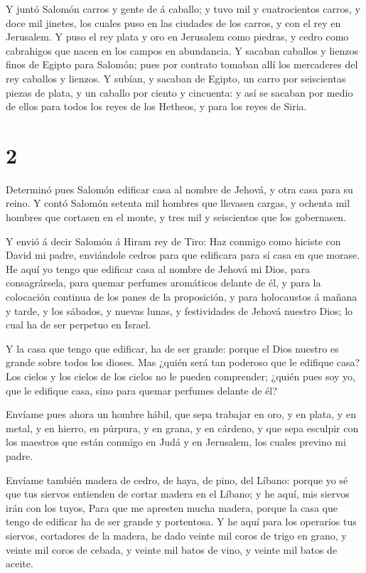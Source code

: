  Y juntó Salomón carros y gente de á caballo; y tuvo mil y
cuatrocientos carros, y doce mil jinetes, los cuales puso en las
ciudades de los carros, y con el rey en Jerusalem.  Y puso
el rey plata y oro en Jerusalem como piedras, y cedro como cabrahigos
que nacen en los campos en abundancia.  Y sacaban caballos
y lienzos finos de Egipto para Salomón; pues por contrato tomaban allí
los mercaderes del rey caballos y lienzos.  Y subían, y
sacaban de Egipto, un carro por seiscientas piezas de plata, y un
caballo por ciento y cincuenta: y así se sacaban por medio de ellos para
todos los reyes de los Hetheos, y para los reyes de Siria.

\hypertarget{section-1}{%
\section{2}\label{section-1}}

 Determinó pues Salomón edificar casa al nombre de Jehová, y
otra casa para su reino.  Y contó Salomón setenta mil
hombres que llevasen cargas, y ochenta mil hombres que cortasen en el
monte, y tres mil y seiscientos que los gobernasen.

 Y envió á decir Salomón á Hiram rey de Tiro: Haz conmigo
como hiciste con David mi padre, enviándole cedros para que edificara
para sí casa en que morase.  He aquí yo tengo que edificar
casa al nombre de Jehová mi Dios, para consagrársela, para quemar
perfumes aromáticos delante de él, y para la colocación continua de los
panes de la proposición, y para holocaustos á mañana y tarde, y los
sábados, y nuevas lunas, y festividades de Jehová nuestro Dios; lo cual
ha de ser perpetuo en Israel.

 Y la casa que tengo que edificar, ha de ser grande: porque
el Dios nuestro es grande sobre todos los dioses.  Mas
¿quién será tan poderoso que le edifique casa? Los cielos y los cielos
de los cielos no le pueden comprender; ¿quién pues soy yo, que le
edifique casa, sino para quemar perfumes delante de él?

 Envíame pues ahora un hombre hábil, que sepa trabajar en
oro, y en plata, y en metal, y en hierro, en púrpura, y en grana, y en
cárdeno, y que sepa esculpir con los maestros que están conmigo en Judá
y en Jerusalem, los cuales previno mi padre.

 Envíame también madera de cedro, de haya, de pino, del
Líbano: porque yo sé que tus siervos entienden de cortar madera en el
Líbano; y he aquí, mis siervos irán con los tuyos,  Para que
me apresten mucha madera, porque la casa que tengo de edificar ha de ser
grande y portentosa.  Y he aquí para los operarios tus
siervos, cortadores de la madera, he dado veinte mil coros de trigo en
grano, y veinte mil coros de cebada, y veinte mil batos de vino, y
veinte mil batos de aceite.

